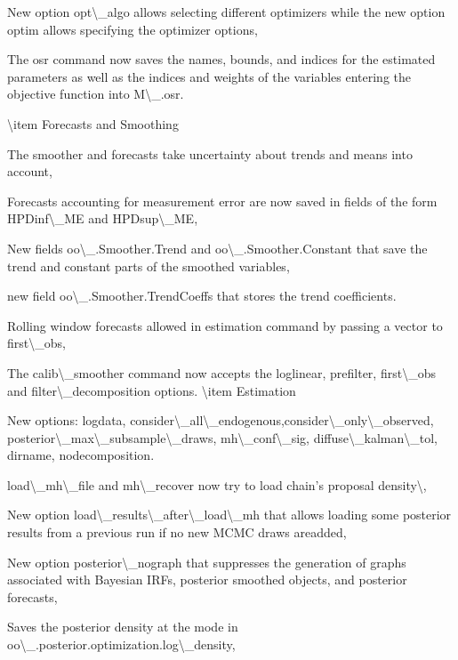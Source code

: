\documentclass[10pt,math=newtx,citestyle=gb7714-2015,bibstyle=gb7714-2015]{elegantbook}
\begin{document}
	
	New option opt\textbackslash{}\_algo allows selecting different optimizers while the new option optim allows specifying the optimizer options,
	
	
	The osr command now saves the names, bounds, and indices for the estimated parameters as well as the indices and weights of the variables entering the objective function into M\textbackslash{}\_.osr.
	
	\textbackslash{}item Forecasts and Smoothing
	
	
	The smoother and forecasts take uncertainty about trends and means into account,
	
	
	Forecasts accounting for measurement error are now saved in fields of the form HPDinf\textbackslash{}\_ME and HPDsup\textbackslash{}\_ME,
	
	
	New fields oo\textbackslash{}\_.Smoother.Trend and oo\textbackslash{}\_.Smoother.Constant that save the trend and constant parts of the smoothed variables,
	
	
	new field oo\textbackslash{}\_.Smoother.TrendCoeffs that stores the trend coefficients.
	
	
	Rolling window forecasts allowed in estimation command by passing a vector to first\textbackslash{}\_obs,
	
	
	The calib\textbackslash{}\_smoother command now accepts the loglinear, prefilter, first\textbackslash{}\_obs and filter\textbackslash{}\_decomposition options.
	\textbackslash{}item Estimation
	
	
	New options: logdata, consider\textbackslash{}\_all\textbackslash{}\_endogenous,consider\textbackslash{}\_only\textbackslash{}\_observed, posterior\textbackslash{}\_max\textbackslash{}\_subsample\textbackslash{}\_draws, mh\textbackslash{}\_conf\textbackslash{}\_sig, diffuse\textbackslash{}\_kalman\textbackslash{}\_tol, dirname, nodecomposition.
	
	
	load\textbackslash{}\_mh\textbackslash{}\_file and mh\textbackslash{}\_recover now try to load chain's proposal density\textbackslash{},
	
	
	New option load\textbackslash{}\_results\textbackslash{}\_after\textbackslash{}\_load\textbackslash{}\_mh that allows loading some posterior results from a previous run if no new MCMC draws areadded,
	
	
	New option posterior\textbackslash{}\_nograph that suppresses the generation of graphs associated with Bayesian IRFs, posterior smoothed objects, and posterior forecasts,
	
	
	Saves the posterior density at the mode in oo\textbackslash{}\_.posterior.optimization.log\textbackslash{}\_density,
	
\end{document}
